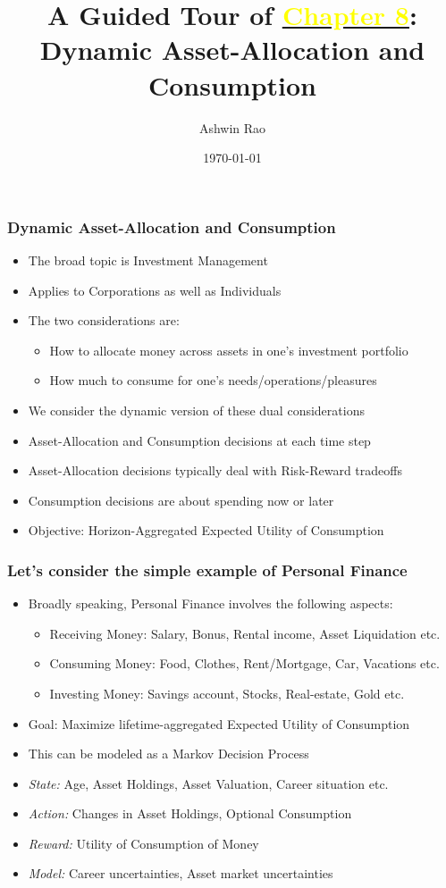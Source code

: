 \documentclass[handout]{beamer}
\title[Asset-Allocation Chapter]{A Guided Tour of \href{http://stanford.edu/~ashlearn/RLForFinanceBook/book.pdf}{\underline{\textcolor{yellow}{Chapter 8}}}: \\  Dynamic Asset-Allocation and Consumption}
\author{Ashwin Rao} %
\institute[Stanford] %
{
ICME, Stanford University
}
\date{\today} %
\begin{document}
\begin{frame}
\titlepage %
\end{frame}

\begin{frame}
\frametitle{Dynamic Asset-Allocation and Consumption}
\pause
\begin{itemize}[<+->]
\item The broad topic is Investment Management
\item Applies to Corporations as well as Individuals
\item The two considerations are:
\pause
\begin{itemize}[<+->]
\item How to allocate money across assets in one's investment portfolio
\item How much to consume for one's needs/operations/pleasures
\end{itemize}
\item We consider the dynamic version of these dual considerations
\item Asset-Allocation and Consumption decisions at each time step
\item Asset-Allocation decisions typically deal with Risk-Reward tradeoffs
\item Consumption decisions are about spending now or later
\item Objective: Horizon-Aggregated Expected Utility of Consumption
\end{itemize}
\end{frame}

\begin{frame}
\frametitle{Let's consider the simple example of Personal Finance}
\pause
\begin{itemize}[<+->]
\item Broadly speaking, Personal Finance involves the following aspects:
\pause
\begin{itemize}[<+->]
\item Receiving Money: Salary, Bonus, Rental income, Asset Liquidation etc.
\item Consuming Money: Food, Clothes, Rent/Mortgage, Car, Vacations etc.
\item Investing Money: Savings account, Stocks, Real-estate, Gold etc.
\end{itemize}
\item Goal: Maximize lifetime-aggregated Expected Utility of Consumption
\item This can be modeled as a Markov Decision Process
\item {\em State:} Age, Asset Holdings, Asset Valuation, Career situation etc.
\item {\em Action:} Changes in Asset Holdings, Optional Consumption
\item {\em Reward:} Utility of Consumption of Money
\item {\em Model:} Career uncertainties, Asset market uncertainties
\end{itemize}
\end{frame}
\end{document}
